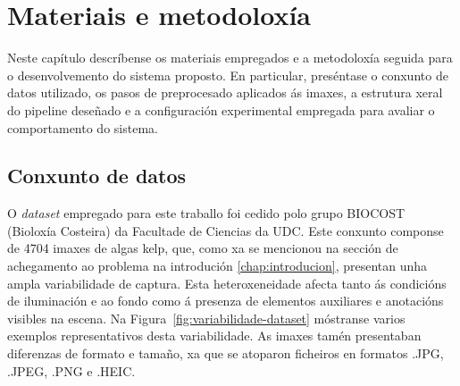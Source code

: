 \chapter{Materiais e metodoloxía}
\label{chap:materiais-metodoloxia}

Neste capítulo descríbense os materiais empregados e a metodoloxía seguida para o desenvolvemento
do sistema proposto. En particular, preséntase o conxunto de datos utilizado, os pasos de
preprocesado aplicados ás imaxes, a estrutura xeral do pipeline deseñado e a configuración
experimental empregada para avaliar o comportamento do sistema.

\section{Conxunto de datos}
O \textit{dataset} empregado para este traballo foi cedido polo grupo BIOCOST (Bioloxía Costeira) da Facultade de Ciencias da UDC.
Este conxunto componse de 4704 imaxes de algas \gls{kelp}, que, como xa se mencionou na sección de
achegamento ao problema na introdución \ref{chap:introducion}, presentan unha ampla variabilidade de captura. Esta heteroxeneidade afecta
tanto ás condicións de iluminación e ao fondo como á presenza de elementos auxiliares e anotacións
visibles na escena. Na Figura~\ref{fig:variabilidade-dataset} móstranse varios exemplos
representativos desta variabilidade. As imaxes tamén presentaban diferenzas de formato e tamaño, xa
que se atoparon ficheiros en formatos .JPG, .JPEG, .PNG e .HEIC.

